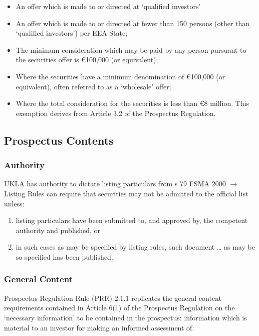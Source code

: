 \documentclass[
]{article}
\providecommand{\tightlist}{%
  \setlength{\itemsep}{0pt}\setlength{\parskip}{0pt}}
\begin{document}
\begin{itemize}
\tightlist
\item
  An offer which is made to or directed at `qualified investors'
\item
  An offer which is made to or directed at fewer than 150 persons (other
  than `qualified investors') per EEA State;
\item
  The minimum consideration which may be paid by any person pursuant to
  the securities offer is €100,000 (or equivalent);
\item
  Where the securities have a minimum denomination of €100,000 (or
  equivalent), often referred to as a `wholesale' offer;
\item
  Where the total consideration for the securities is less than €8
  million. This exemption derives from Article 3.2 of the Prospectus
  Regulation.
\end{itemize}

\hypertarget{prospectus-contents}{%
\subsection{Prospectus Contents}\label{prospectus-contents}}

\hypertarget{authority}{%
\subsubsection{Authority}\label{authority}}

UKLA has authority to dictate listing particulars from s 79 FSMA 2000
\(\rightarrow\) Listing Rules can require that securities may not be
admitted to the official list unless:

\begin{enumerate}
\def\labelenumi{\arabic{enumi}.}
\tightlist
\item
  listing particulars have been submitted to, and approved by, the
  competent authority and published, or
\item
  in such cases as may be specified by listing rules, such document
  \ldots{} as may be so specified has been published.
\end{enumerate}

\hypertarget{general-content}{%
\subsubsection{General Content}\label{general-content}}

Prospectus Regulation Rule (PRR) 2.1.1 replicates the general content
requirements contained in Article 6(1) of the Prospectus Regulation on
the `necessary information' to be contained in the prospectus:
information which is material to an investor for making an informed
assessment of:
\end{document}
